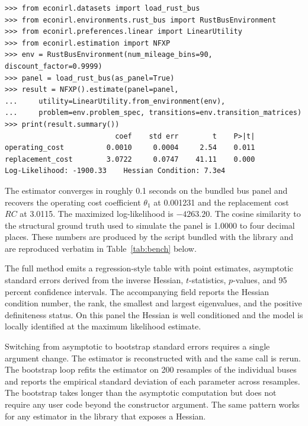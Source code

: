 \begin{lstlisting}[style=econirlsession,caption={Fitting the nested fixed point estimator on the Rust bus panel. Reproduced by \code{code\_snippets/listing2\_nfxp\_example.py}.},label={lst:nfxp}]
>>> from econirl.datasets import load_rust_bus
>>> from econirl.environments.rust_bus import RustBusEnvironment
>>> from econirl.preferences.linear import LinearUtility
>>> from econirl.estimation import NFXP
>>> env = RustBusEnvironment(num_mileage_bins=90, discount_factor=0.9999)
>>> panel = load_rust_bus(as_panel=True)
>>> result = NFXP().estimate(panel=panel,
...     utility=LinearUtility.from_environment(env),
...     problem=env.problem_spec, transitions=env.transition_matrices)
>>> print(result.summary())
                          coef    std err        t    P>|t|
operating_cost          0.0010     0.0004     2.54    0.011
replacement_cost        3.0722     0.0747    41.11    0.000
Log-Likelihood: -1900.33    Hessian Condition: 7.3e4
\end{lstlisting}

The estimator converges in roughly 0.1 seconds on the bundled bus panel and recovers the operating cost coefficient $\theta_1$ at 0.001231 and the replacement cost $RC$ at 3.0115. The maximized log-likelihood is $-4263.20$. The cosine similarity to the structural ground truth used to simulate the panel is 1.0000 to four decimal places. These numbers are produced by the script  bundled with the library and are reproduced verbatim in Table~\ref{tab:bench} below.

The full  method emits a regression-style table with point estimates, asymptotic standard errors derived from the inverse Hessian, $t$-statistics, $p$-values, and 95 percent confidence intervals. The accompanying  field reports the Hessian condition number, the rank, the smallest and largest eigenvalues, and the positive definiteness status. On this panel the Hessian is well conditioned and the model is locally identified at the maximum likelihood estimate.

Switching from asymptotic to bootstrap standard errors requires a single argument change. The estimator is reconstructed with  and the same  call is rerun. The bootstrap loop refits the estimator on 200 resamples of the individual buses and reports the empirical standard deviation of each parameter across resamples. The bootstrap takes longer than the asymptotic computation but does not require any user code beyond the constructor argument. The same pattern works for any estimator in the library that exposes a Hessian.

